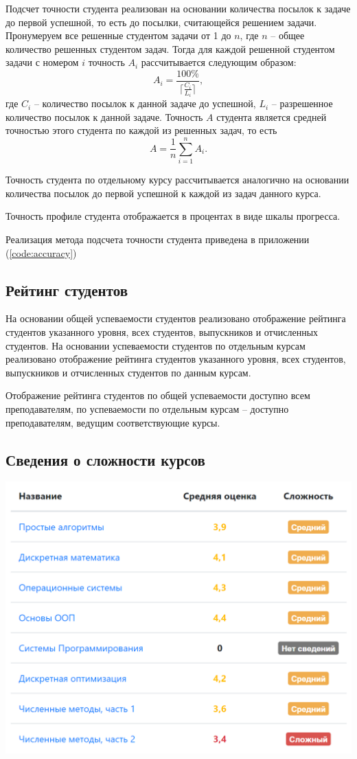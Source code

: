 \documentclass[14pt, a4paper, oneside]{extarticle}
\begin{document}
Подсчет точности студента реализован на основании количества посылок к задаче до первой успешной, то есть до посылки, считающейся решением задачи. Пронумеруем все решенные студентом задачи от 1 до $n$, где $n$ – общее количество решенных студентом задач. Тогда для каждой решенной студентом задачи с номером $i$ точность $A_i$ рассчитывается следующим образом: 
$$A_i=\frac{100\%}{\lceil \frac{C_i}{L_i}\rceil},$$
где $C_i$ – количество посылок к данной задаче до успешной, $L_i$ – разрешенное количество посылок к данной задаче. Точность $A$ студента является средней точностью этого студента по каждой из решенных задач, то есть
$$A=\frac{1}{n}\sum_{i=1}^{n}A_i.$$

Точность студента по отдельному курсу рассчитывается аналогично на основании количества посылок до первой успешной к каждой из задач данного курса.

Точность профиле студента отображается в процентах в виде шкалы прогресса.

Реализация метода подсчета точности студента приведена в приложении (\ref{code:accuracy})
\subsection{Рейтинг студентов}
На основании общей успеваемости студентов реализовано отображение рейтинга студентов указанного уровня, всех студентов, выпускников и отчисленных студентов. На основании успеваемости студентов по отдельным курсам реализовано отображение рейтинга студентов указанного уровня, всех студентов, выпускников и отчисленных студентов по данным курсам.

Отображение рейтинга студентов по общей успеваемости доступно всем преподавателям, по успеваемости по отдельным курсам – доступно преподавателям, ведущим соответствующие курсы.
\subsection{Сведения о сложности курсов}
\begin{center}
    \includegraphics[scale=0.45]{course-difficulty}
\end{center}
\end{document}
